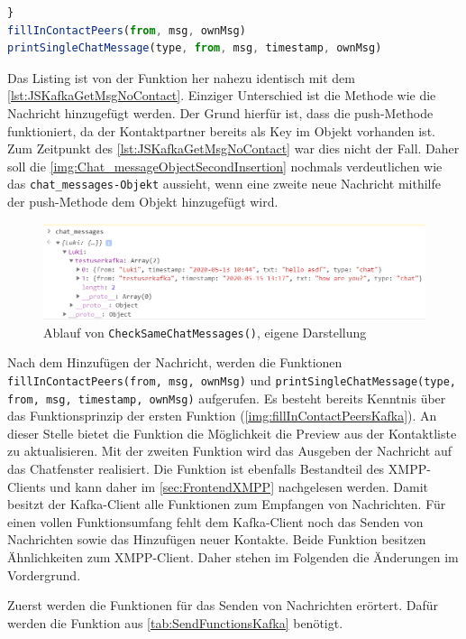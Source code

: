 \documentclass[a4paper,titlepage,halfparskip,12pt]{scrreprt}
\begin{document}
\begin{onehalfspacing}
\begin{lstlisting}[language=Javascript,caption=Weitere Verarbeitung der Nachricht,label={lst:JSKafkaNoSameMsg}]
}
fillInContactPeers(from, msg, ownMsg)
printSingleChatMessage(type, from, msg, timestamp, ownMsg)
\end{lstlisting}
Das Listing ist von der Funktion her nahezu identisch mit dem \autoref{lst:JSKafkaGetMsgNoContact}. Einziger Unterschied ist die Methode wie die Nachricht hinzugefügt werden. Der Grund hierfür ist, dass die push-Methode funktioniert, da der Kontaktpartner bereits als Key im Objekt vorhanden ist. Zum Zeitpunkt des \autoref{lst:JSKafkaGetMsgNoContact} war dies nicht der Fall. Daher soll die \autoref{img:Chat_messageObjectSecondInsertion} nochmals verdeutlichen wie das \texttt{chat\_messages-Objekt} aussieht, wenn eine zweite neue Nachricht mithilfe der push-Methode dem Objekt hinzugefügt wird.
\begin{figure}[h]
	\centering
	\includegraphics[scale=1.0]{images/Chat_messageObjectSecondInsertion}
	\caption{Ablauf von \texttt{CheckSameChatMessages()}, eigene Darstellung}
	\label{img:Chat_messageObjectSecondInsertion}
\end{figure}
Nach dem Hinzufügen der Nachricht, werden die Funktionen \texttt{fillInContactPeers(from, msg, ownMsg)} und \texttt{printSingleChatMessage(type, from, msg, timestamp, ownMsg)} aufgerufen. Es besteht bereits Kenntnis über das Funktionsprinzip der ersten Funktion (\autoref{img:fillInContactPeersKafka}). An dieser Stelle bietet die Funktion die Möglichkeit die Preview aus der Kontaktliste zu aktualisieren. Mit der zweiten Funktion wird das Ausgeben der Nachricht auf das Chatfenster realisiert. Die Funktion ist ebenfalls Bestandteil des XMPP-Clients und kann daher im \autoref{sec:FrontendXMPP} nachgelesen werden. Damit besitzt der Kafka-Client alle Funktionen zum Empfangen von Nachrichten. Für einen vollen Funktionsumfang fehlt dem Kafka-Client noch das Senden von Nachrichten sowie das Hinzufügen neuer Kontakte. Beide Funktion besitzen Ähnlichkeiten zum XMPP-Client. Daher stehen im Folgenden die Änderungen im Vordergrund.

\pagebreak

Zuerst werden die Funktionen für das Senden von Nachrichten erörtert. Dafür werden die Funktion aus \autoref{tab:SendFunctionsKafka} benötigt.


\end{onehalfspacing}
\end{document}
